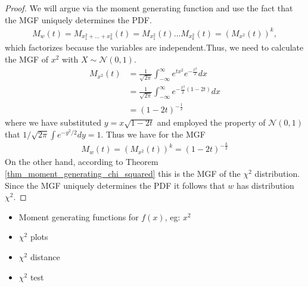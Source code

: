 \documentclass[10pt,a4paper]{article}
\begin{document}
\begin{proof}
We will argue via the moment generating function and use the fact that the MGF uniquely determines the PDF.
\begin{align}
M_w(t) = M_{x_1^2+\dots+x_k^2}(t) =  M_{x_1^2}(t) \dots M_{x_k^2}(t) =  (M_{x^2}(t))^k,
\end{align}
which factorizes because the variables are independent.Thus, we need to calculate the MGF of $x^2$ with $X \sim \mathcal{N}(0,1)$.
\begin{align*}
M_{x^2}(t)  
&=  \frac{1}{\sqrt{2\pi}} \int_{-\infty}^{\infty} e^{tx^2} e^{-\frac{x^2}{2}}dx \\
&=  \frac{1}{\sqrt{2\pi}} \int_{-\infty}^{\infty}  e^{-\frac{x^2}{2}(1-2t)}dx \\ 
&= (1-2t)^{-\frac{1}{2}}
\end{align*}
where we have substituted $y=x\sqrt{1-2t}$ and employed the property of $\mathcal N(0,1)$ that $ 1/\sqrt{2\pi} \int e^{-y^2/2} dy =1 $. Thus we have for the MGF
\begin{align}
M_w(t) = (M_{x^2}(t))^k = (1-2t)^{-\frac{k}{2}}
\end{align}
On the other hand, according to Theorem \ref{thm_moment_generating_chi_squared} this is the MGF of the $\chi^2$  distribution. Since the MGF uniquely determines the PDF it follows that $w$ has distribution $\chi^2$.
\end{proof}

\begin{itemize}
\item Moment generating functions for $f(x)$, eg: $x^2$
\item $\chi^2$ plots
\item $\chi^2$ distance
\item $\chi^2$ test
\end{itemize} 


\end{document}
